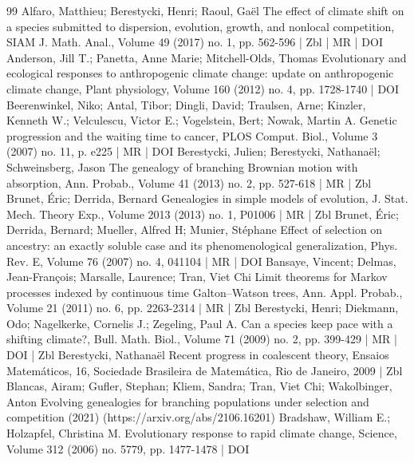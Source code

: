 \documentclass[10pt]{amsart}
\theoremstyle{definition}\newtheorem{defi}[theo]{Definition}\newtheorem{rema}[theo]{Remark}\newtheorem{exam}[theo]{Example}\newtheorem{exem}[theo]{Example}\newtheorem{nota}[theo]{Notation}
\begin{document}
\begin{thebibliography}{99}
Alfaro, Matthieu; Berestycki, Henri; Raoul, Gaël The effect of climate shift on a species submitted to dispersion, evolution, growth, and nonlocal competition, SIAM J. Math. Anal., Volume 49 (2017) no. 1, pp. 562-596 | Zbl | MR | DOI
Anderson, Jill T.; Panetta, Anne Marie; Mitchell-Olds, Thomas Evolutionary and ecological responses to anthropogenic climate change: update on anthropogenic climate change, Plant physiology, Volume 160 (2012) no. 4, pp. 1728-1740 | DOI
Beerenwinkel, Niko; Antal, Tibor; Dingli, David; Traulsen, Arne; Kinzler, Kenneth W.; Velculescu, Victor E.; Vogelstein, Bert; Nowak, Martin A. Genetic progression and the waiting time to cancer, PLOS Comput. Biol., Volume 3 (2007) no. 11, p. e225 | MR | DOI
Berestycki, Julien; Berestycki, Nathanaël; Schweinsberg, Jason The genealogy of branching Brownian motion with absorption, Ann. Probab., Volume 41 (2013) no. 2, pp. 527-618 | MR | Zbl
Brunet, Éric; Derrida, Bernard Genealogies in simple models of evolution, J. Stat. Mech. Theory Exp., Volume 2013 (2013) no. 1, P01006 | MR | Zbl
Brunet, Éric; Derrida, Bernard; Mueller, Alfred H; Munier, Stéphane Effect of selection on ancestry: an exactly soluble case and its phenomenological generalization, Phys. Rev. E, Volume 76 (2007) no. 4, 041104 | MR | DOI
Bansaye, Vincent; Delmas, Jean-François; Marsalle, Laurence; Tran, Viet Chi Limit theorems for Markov processes indexed by continuous time Galton–Watson trees, Ann. Appl. Probab., Volume 21 (2011) no. 6, pp. 2263-2314 | MR | Zbl
Berestycki, Henri; Diekmann, Odo; Nagelkerke, Cornelis J.; Zegeling, Paul A. Can a species keep pace with a shifting climate?, Bull. Math. Biol., Volume 71 (2009) no. 2, pp. 399-429 | MR | DOI | Zbl
Berestycki, Nathanaël Recent progress in coalescent theory, Ensaios Matemáticos, 16, Sociedade Brasileira de Matemática, Rio de Janeiro, 2009 | Zbl
Blancas, Airam; Gufler, Stephan; Kliem, Sandra; Tran, Viet Chi; Wakolbinger, Anton Evolving genealogies for branching populations under selection and competition (2021) (https://arxiv.org/abs/2106.16201)
Bradshaw, William E.; Holzapfel, Christina M. Evolutionary response to rapid climate change, Science, Volume 312 (2006) no. 5779, pp. 1477-1478 | DOI

\end{thebibliography}
\end{document}
